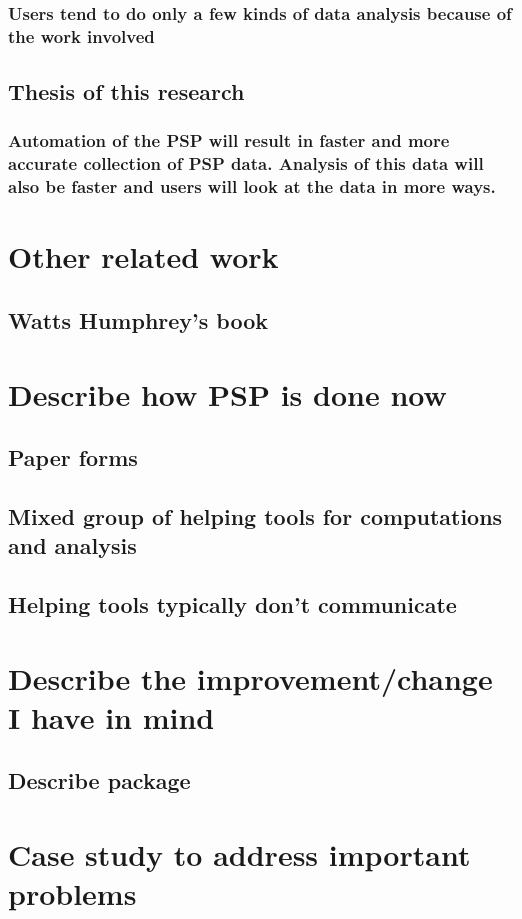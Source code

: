 \subsection{Users tend to do only a few kinds of data analysis because of the work involved}
\section{Thesis of this research}
\subsection{Automation of the PSP will result in faster and more accurate collection of PSP data.  Analysis of this data will also be faster and users will look at the data 
in more ways.}
\chapter{Other related work}
\section{Watts Humphrey's book}
\chapter{Describe how PSP is done now}
\section{Paper forms}
\section{Mixed group of helping tools for computations and analysis}
\section{Helping tools typically don't communicate}
\chapter{Describe the improvement/change I have in mind}
\section{Describe package}
\chapter{Case study to address important problems}
